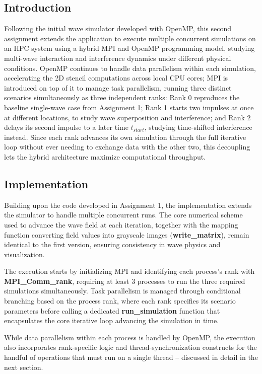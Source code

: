 \subsection{Introduction}
Following the initial wave simulator developed with OpenMP, this second assignment extends the application to execute multiple concurrent simulations on an HPC system using a hybrid MPI and OpenMP programming model, studying multi-wave interaction and interference dynamics under different physical conditions. OpenMP continues to handle data parallelism within each simulation, accelerating the 2D stencil computations across local CPU cores; MPI is introduced on top of it to manage task parallelism, running three distinct scenarios simultaneously as three independent ranks: Rank 0 reproduces the baseline single-wave case from Assignment 1; Rank 1 starts two impulses at once at different locations, to study wave superposition and interference; and Rank 2 delays its second impulse to a later time $t_{start}$, studying time-shifted interference instead. Since each rank advances its own simulation through the full iterative loop without ever needing to exchange data with the other two, this decoupling lets the hybrid architecture maximize computational throughput.

\subsection{Implementation}

Building upon the code developed in Assignment 1, the implementation extends the simulator to handle multiple concurrent runs. The core numerical scheme used to advance the wave field at each iteration, together with the mapping function converting field values into grayscale images (\textbf{write\_matrix}), remain identical to the first version, ensuring consistency in wave physics and visualization.

The execution starts by initializing MPI and identifying each process's rank with \textbf{MPI\_Comm\_rank}, requiring at least 3 processes to run the three required simulations simultaneously. Task parallelism is managed through conditional branching based on the process rank, where each rank specifies its scenario parameters before calling a dedicated \textbf{run\_simulation} function that encapsulates the core iterative loop advancing the simulation in time.

While data parallelism within each process is handled by OpenMP, the execution also incorporates rank-specific logic and thread-synchronization constructs for the handful of operations that must run on a single thread -- discussed in detail in the next section.

